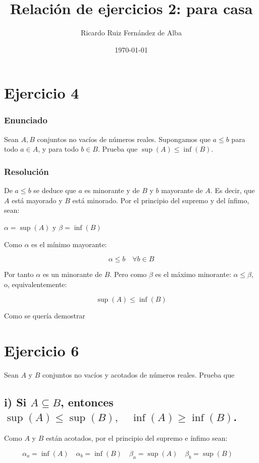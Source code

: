 \documentclass[11pt]{article}
\author{Ricardo Ruiz Fernández de Alba}
\date{\today}
\title{Relación de ejercicios 2: para casa}
\begin{document}
\maketitle

\section{Ejercicio 4}
\label{sec-1}
\subsubsection{Enunciado}
\label{sec-1-0-1}
Sean $A,B$ conjuntos no vacíos de números reales. Supongamos que $a \leq b$
para todo $a \in A$, y para todo $b \in B$.  Prueba que $\sup(A) \leq \inf(B)$.

\subsubsection{Resolución}
\label{sec-1-0-2}

De $a\leq b$ se deduce que $a$ es minorante y de $B$ y $b$ mayorante de $A$.
Es decir, que $A$ está mayorado y $B$ está minorado. Por el principio del supremo
y del ínfimo, sean:

$\alpha = \sup(A)$ y $\beta =
\inf(B)$

Como $\alpha$ es el mínimo mayorante:

\[\alpha \leq b \quad \forall b \in B\]

Por tanto $\alpha$ es un minorante de $B$. Pero como $\beta$ es el máximo
minorante: $\alpha \leq \beta$, o, equivalentemente:

\[
\sup(A) \leq \inf(B)
\]

Como se quería demostrar

\section{Ejercicio 6}
\label{sec-2}
Sean $A$ y $B$ conjuntos no vacíos y acotados de números reales. Prueba que

\subsection{i) Si $A \subseteq B$, entonces $\sup(A) \leq \sup(B), \quad \inf(A) \geq \inf(B)$.}
\label{sec-2-1}

Como $A$ y $B$ están acotados, por el principio del supremo
e ínfimo sean:

\[
\alpha_a = \inf(A) \quad
\alpha_b = \inf(B) \quad
\beta_a = \sup(A) \quad
\beta_b = \sup(B) \quad
\]
\end{document}
